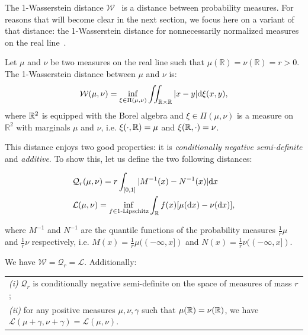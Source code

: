 The 1-Wasserstein distance $\mathcal W$~\cite[\S6]{Villani09} is a distance between probability measures. 
For reasons that will become clear in the next section, we focus here on a variant of that distance: 
the 1-Wasserstein distance for nonnecessarily normalized measures on the real line~\cite[\S2]{Santambrogio15}. 

\begin{defin}
Let $\mu$ and $\nu$ be two measures on the real line such that 
$\mu(\mathbb{R})=\nu(\mathbb{R})=r>0$. 
The 1-Wasserstein distance between $\mu$ and $\nu$ is:
\begin{equation}\label{eq:optimal}
\mathcal W(\mu,\nu)=\inf_{\xi\in\Pi(\mu,\nu)} \iint_{\mathbb{R}\times\mathbb{R}} |x-y| {\rm d}\xi(x,y),
\end{equation}
where $\mathbb{R}^2$ is equipped with the Borel algebra and  
$\xi\in\Pi(\mu,\nu)$ is a measure on $\mathbb{R}^2$ with marginals $\mu$ and $\nu$, i.e. $\xi(\cdot,\mathbb{R})=\mu$ and $\xi(\mathbb{R},\cdot)=\nu$.
\end{defin}

This distance enjoys two good properties: it is {\em conditionally negative semi-definite} and {\em additive}.
To show this, let us define the two following distances:

\begin{align}
&\mathcal{Q}_r(\mu,\nu)=r \int_{[0,1]} | M^{-1}(x)- N^{-1}(x)| {\rm d}x\label{eq:quantile}\\
&\mathcal{L}(\mu,\nu)=\inf_{f\in 1\text{-Lipschitz}}\int_{\mathbb{R}} f(x) [\mu({\rm d}x)-\nu({\rm d}x)],\label{eq:Kanto}
\end{align}

where $M^{-1}$ and $N^{-1}$ are the quantile functions of the probability measures $\frac 1r \mu$ and $\frac 1r \nu$ respectively, i.e.
$M(x)=\frac 1r \mu((-\infty,x])$ and $N(x)=\frac 1r \nu((-\infty,x])$. 

\begin{prop}\label{prop:wasser1D}
We have $\mathcal{W}=\mathcal{Q}_r=\mathcal{L}$. 
Additionally:

\begin{tabular}{l}
\emph{(i)} $\mathcal{Q}_r$ is conditionally negative semi-definite on the space of measures of mass $r$; \\
\emph{(ii)} for any positive measures $\mu,\nu,\gamma$ such that $\mu(\mathbb{R})=\nu(\mathbb{R})$, 
we have $\mathcal{L}(\mu+\gamma,\nu+\gamma)=\mathcal{L}(\mu,\nu)$.
\end{tabular}
\end{prop}

